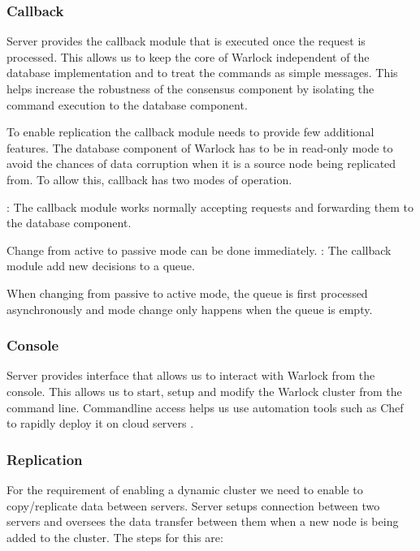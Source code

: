 \subsubsection{Callback}

Server provides the callback module that is executed once the request is
processed. This allows us to keep the core of Warlock independent of the
database implementation and to treat the commands as simple messages. This
helps increase the robustness of the consensus component by isolating the
command execution to the database component.

To enable replication  the
callback module needs to provide few additional features. The database
component of Warlock has to be in read-only mode to avoid the chances of
data corruption when it is a source node being replicated from. To allow
this, callback has two modes of operation.

\begin{itemize}
    : The callback module works normally accepting requests
    and forwarding them to the database component.

    Change from active to passive mode can be done immediately.
    : The callback module add new decisions to a queue.

    When changing from passive to active mode, the queue is first processed
    asynchronously and mode change only happens when the queue is empty.
\end{itemize}

\subsubsection{Console}

Server provides interface that allows us to interact with Warlock from the
console. This allows us to start, setup and modify the Warlock cluster from
the command line. Commandline access helps us use automation tools such as
Chef \citep{Chef} to rapidly deploy it on cloud servers
\citep{Armbrust:2010:VCC:1721654.1721672, amazonAWS}.

\subsubsection{Replication}
\label{section:analysis.design.replication}

For the requirement  of enabling a dynamic
cluster we need to enable to copy/replicate data between servers.
Server setups connection between two servers and oversees the data transfer
between them when a new node is being added to the cluster. The steps for
this are:

